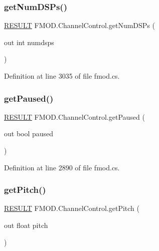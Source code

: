 \subsubsection{\texorpdfstring{get\+Num\+D\+S\+Ps()}{getNumDSPs()}}
{\footnotesize\ttfamily \hyperlink{namespace_f_m_o_d_a305d1176ef3f8c8815861a60407ac33d}{R\+E\+S\+U\+LT} F\+M\+O\+D.\+Channel\+Control.\+get\+Num\+D\+S\+Ps (\begin{DoxyParamCaption}\item[{out int}]{numdsps }\end{DoxyParamCaption})}



Definition at line 3035 of file fmod.\+cs.

\mbox{\label{class_f_m_o_d_1_1_channel_control_a7cbe5f2fbd3b159f7a62d0164dc4cca8}} 
\subsubsection{\texorpdfstring{get\+Paused()}{getPaused()}}
{\footnotesize\ttfamily \hyperlink{namespace_f_m_o_d_a305d1176ef3f8c8815861a60407ac33d}{R\+E\+S\+U\+LT} F\+M\+O\+D.\+Channel\+Control.\+get\+Paused (\begin{DoxyParamCaption}\item[{out bool}]{paused }\end{DoxyParamCaption})}



Definition at line 2890 of file fmod.\+cs.

\mbox{\label{class_f_m_o_d_1_1_channel_control_ac8d0b1ea451b36e8e74c6c3fabe82862}} 
\subsubsection{\texorpdfstring{get\+Pitch()}{getPitch()}}
{\footnotesize\ttfamily \hyperlink{namespace_f_m_o_d_a305d1176ef3f8c8815861a60407ac33d}{R\+E\+S\+U\+LT} F\+M\+O\+D.\+Channel\+Control.\+get\+Pitch (\begin{DoxyParamCaption}\item[{out float}]{pitch }\end{DoxyParamCaption})}



